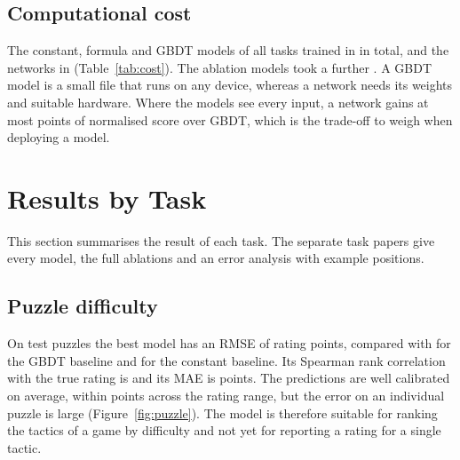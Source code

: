 \documentclass[11pt]{article}
\begin{document}
\subsection{Computational cost}
\label{sec:cost}

\begin{table}[htbp]\centering\small
{}
\caption{Number of models and total training time by task. The constant,
formula and GBDT models were trained on a CPU () and each
network on one GPU (). Ablation models are those trained
only to measure the effect of a modification.}
\label{tab:cost}
\end{table}

The constant, formula and GBDT models of all  tasks
trained in  in total, and the
 networks in 
(Table~\ref{tab:cost}). The  ablation models took a
further . A GBDT model is a small file that runs
on any device, whereas a network needs its weights and suitable hardware.
Where the models see every input, a network gains at most
 points of normalised score over GBDT, which
is the trade-off to weigh when deploying a model.

\section{Results by Task}
\label{sec:each}

This section summarises the result of each task. The separate task papers
give every model, the full ablations and an error analysis with example
positions.

\subsection{Puzzle difficulty}

On  test puzzles the best model has an
RMSE of  rating points, compared with
 for the GBDT baseline and
 for the constant baseline. Its Spearman
rank correlation with the true rating is 
and its MAE is  points. The predictions are
well calibrated on average, within
 points across the rating
range, but the error on an individual puzzle is large
(Figure~\ref{fig:puzzle}). The model is therefore suitable for ranking the
tactics of a game by difficulty and not yet for reporting a rating for a
single tactic.
\end{document}
